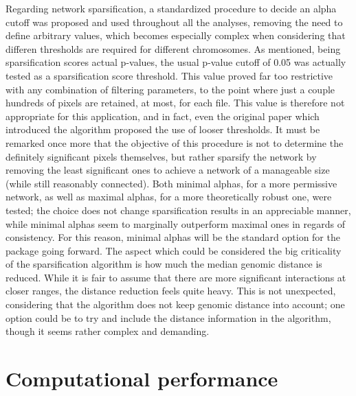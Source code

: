 Regarding network sparsification, a standardized procedure to decide an alpha cutoff was proposed and used throughout all the analyses, removing the need to define arbitrary values, which becomes especially complex when considering that differen thresholds are required for different chromosomes. As mentioned, being sparsification scores actual p-values, the usual p-value cutoff of 0.05 was actually tested as a sparsification score threshold. This value proved far too restrictive with any combination of filtering parameters, to the point where just a couple hundreds of pixels are retained, at most, for each file. This value is therefore not appropriate for this application, and in fact, even the original paper which introduced the algorithm proposed the use of looser thresholds. It must be remarked once more that the objective of this procedure is not to determine the definitely significant pixels themselves, but rather sparsify the network by removing the least significant ones to achieve a network of a manageable size (while still reasonably connected). Both minimal alphas, for a more permissive network, as well as maximal alphas, for a more theoretically robust one, were tested; the choice does not change sparsification results in an appreciable manner, while minimal alphas seem to marginally outperform maximal ones in regards of consistency. For this reason, minimal alphas will be the standard option for the package going forward. The aspect which could be considered the big criticality of the sparsification algorithm is how much the median genomic distance is reduced. While it is fair to assume that there are more significant interactions at closer ranges, the distance reduction feels quite heavy. This is not unexpected, considering that the algorithm does not keep genomic distance into account; one option could be to try and include the distance information in the algorithm, though it seems rather complex and demanding.


\section{Computational performance}

